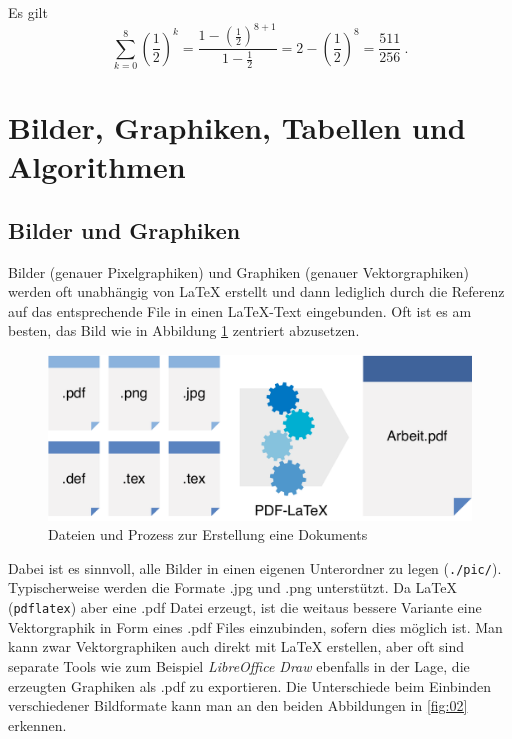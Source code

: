 \documentclass[10pt]{report}
\begin{document}
\begin{Beispiel}
Es gilt
\[
\sum_{k=0}^8 \left(\frac{1}{2}\right)^k = \frac{1-(\frac{1}{2})^{8+1}}{1-\frac{1}{2}} = 2 - \left(\frac{1}{2}\right)^8 = \frac{511}{256}\ .
\]
\end{Beispiel}
\section{Bilder, Graphiken, Tabellen und Algorithmen}

\subsection{Bilder und Graphiken}

Bilder (genauer Pixelgraphiken) und Graphiken (genauer Vektorgraphiken) werden oft unabh\"angig von \LaTeX{} erstellt und dann lediglich durch die Referenz auf das entsprechende File in einen \LaTeX-Text eingebunden. Oft ist es am besten, das Bild wie in Abbildung \ref{fig:01} zentriert abzusetzen.

\begin{figure}[htbp] %
\centering
\includegraphics[width=.9\linewidth]{./pic/Graphic.pdf}
\caption{Dateien und Prozess zur Erstellung eine Dokuments}
\label{fig:01}
\end{figure}

Dabei ist es sinnvoll, alle Bilder in einen eigenen Unterordner zu legen (\verb|./pic/|). Typischerweise werden die Formate .jpg und .png unterst\"utzt. Da \LaTeX{} (\verb|pdflatex|) aber eine .pdf Datei erzeugt, ist die weitaus bessere Variante eine Vektorgraphik in Form eines .pdf Files einzubinden, sofern dies m\"oglich ist. Man kann zwar Vektorgraphiken auch direkt mit \LaTeX{} erstellen, aber oft sind separate Tools wie zum Beispiel \textit{LibreOffice Draw} ebenfalls in der Lage, die erzeugten Graphiken als .pdf zu exportieren. Die Unterschiede beim Einbinden verschiedener Bildformate kann man an den beiden Abbildungen in \ref{fig:02} erkennen.
\end{document}
